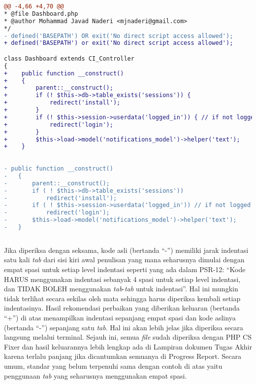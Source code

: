 \begin{lstlisting}[language=diff, basicstyle=\ttfamily, frame=single,
	columns=fullflexible, showspaces=true, keepspaces=true, breaklines=true, label=ck:32, caption=Contoh penggunaan PHP CS Fixer pada sebagian kode \textit{Dashboard.php} dengan mengaktifkan parameter \textit{showspaces} yang menampilkan jarak \textit{space}]
@@ -4,66 +4,70 @@
* @file Dashboard.php
* @author Mohammad Javad Naderi <mjnaderi@gmail.com>
*/
- defined('BASEPATH') OR exit('No direct script access allowed');
+ defined('BASEPATH') or exit('No direct script access allowed');

class Dashboard extends CI_Controller
{
+    public function __construct()
+    {
+        parent::__construct();
+        if (! $this->db->table_exists('sessions')) {
+            redirect('install');
+        }
+        if (! $this->session->userdata('logged_in')) { // if not logged in
+            redirect('login');
+        }
+        $this->load->model('notifications_model')->helper('text');
+    }
	
	
- public function __construct()
-	{
-		parent::__construct();
-		if ( ! $this->db->table_exists('sessions'))
-			redirect('install');
-		if ( ! $this->session->userdata('logged_in')) // if not logged in
-			redirect('login');
-		$this->load->model('notifications_model')->helper('text');
-	}
		
\end{lstlisting}

Jika diperiksa dengan seksama, kode asli (bertanda ``-'') memiliki jarak indentasi satu kali \textit{tab} dari sisi kiri awal penulisan yang mana seharusnya dimulai dengan empat spasi untuk setiap level indentasi seperti yang ada dalam PSR-12: ``Kode HARUS menggunakan indentasi sebanyak 4 spasi untuk setiap level indentasi, dan TIDAK BOLEH menggunakan \textit{tab}-\textit{tab} untuk indentasi''. Hal ini mungkin tidak terlihat secara sekilas oleh mata sehingga harus diperiksa kembali setiap indentasinya. Hasil rekomendasi perbaikan yang diberikan keluaran (bertanda ``+'') di atas menampilkan indentasi sepanjang empat spasi dan kode aslinya (bertanda ``-'') sepanjang satu \textit{tab}. Hal ini akan lebih jelas jika diperiksa secara langsung melalui terminal. 
Sejauh ini, semua \textit{file} sudah diperiksa dengan PHP CS Fixer dan hasil keluarannya lebih lengkap ada di Lampiran dokumen Tugas Akhir karena terlalu panjang jika dicantumkan semuanya di Progress Report. Secara umum, standar yang belum terpenuhi sama dengan contoh di atas yaitu penggunaan \textit{tab} yang seharusnya menggunakan empat spasi. 			


